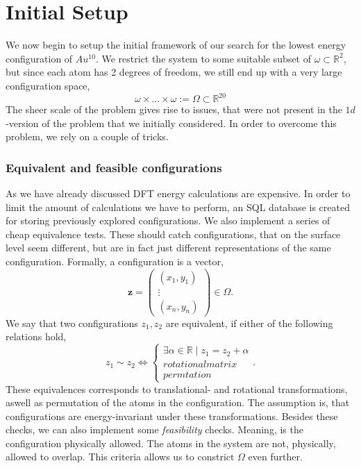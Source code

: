 \documentclass[working, oneside]{../../Preambles/tuftebook}
\begin{document}
\let\cleardoublepage\clearpage
\thispagestyle{fancy}
\chapter{Initial Setup}

We now begin to setup the initial framework of our search for the lowest energy configuration of $Au^{10}$. We restrict the system to some suitable subset of $\omega \subset \mathbb{R}^2$, but since each atom has 2 degrees of freedom, we still end up with a very large configuration space,
\[
\omega \times \ldots \times \omega := \Omega \subset \mathbb{R}^{20}
\]
The sheer scale of the problem gives rise to issues, that were not present in the $1d$-version of the problem that we initially considered. In order to overcome this problem, we rely on a couple of tricks.
\subsection{Equivalent and feasible configurations}
As we have already discussed DFT energy calculations are expensive. In order to limit the amount of calculations we have to perform, an SQL database is created for storing previously explored configurations. We also implement a series of cheap equivalence tests. These should catch configurations, that on the surface level seem different, but are in fact just different representations of the same configuration. Formally, a configuration is a vector,
\[
\bm{z} = \begin{pmatrix} \left( x_1, y_1 \right) \\ \vdots\\ \left( x_n, y_n \right)  \end{pmatrix} \in  \Omega
.\] 
We say that two configurations $z_1, z_2$ are equivalent, if either of the following relations hold,
\[
z_1 \sim z_2 \iff \begin{cases}
    \exists \alpha \in  \mathbb{R} \mid z_1 = z_2+ \alpha \\
    rotational matrix \\
    permtation
\end{cases}
.\] 
These equivalences corresponds to translational- and rotational transformations, aswell as permutation of the atoms in the configuration. The assumption is, that configurations are energy-invariant under these transformations. Besides these checks, we can also implement some \textit{feasibility} checks. Meaning, is the configuration physically allowed. The atoms in the system are not, physically, allowed to overlap. This criteria allows us to constrict $\Omega$ even further.
\end{document}
